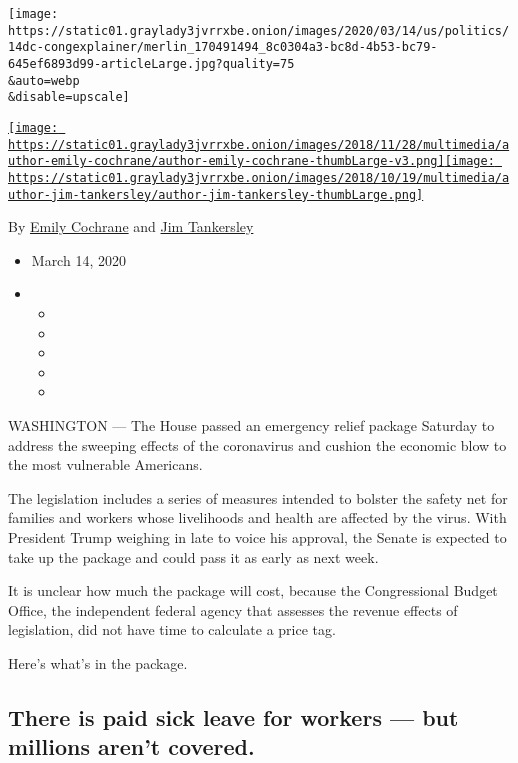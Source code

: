 \texttt{[image: https://static01.graylady3jvrrxbe.onion/images/2020/03/14/us/politics/14dc-congexplainer/merlin\_170491494\_8c0304a3-bc8d-4b53-bc79-645ef6893d99-articleLarge.jpg?quality=75\\\&auto=webp\\\&disable=upscale]}

\href{https://www.nytimes3xbfgragh.onion/by/emily-cochrane}{\texttt{[image: https://static01.graylady3jvrrxbe.onion/images/2018/11/28/multimedia/author-emily-cochrane/author-emily-cochrane-thumbLarge-v3.png]}}\href{https://www.nytimes3xbfgragh.onion/by/jim-tankersley}{\texttt{[image: https://static01.graylady3jvrrxbe.onion/images/2018/10/19/multimedia/author-jim-tankersley/author-jim-tankersley-thumbLarge.png]}}

By \href{https://www.nytimes3xbfgragh.onion/by/emily-cochrane}{Emily
Cochrane} and
\href{https://www.nytimes3xbfgragh.onion/by/jim-tankersley}{Jim
Tankersley}

\begin{itemize}
\item
  March 14, 2020
\item
  \begin{itemize}
  \item
  \item
  \item
  \item
  \item
  \end{itemize}
\end{itemize}

WASHINGTON --- The House passed an emergency relief package Saturday to
address the sweeping effects of the coronavirus and cushion the economic
blow to the most vulnerable Americans.

The legislation includes a series of measures intended to bolster the
safety net for families and workers whose livelihoods and health are
affected by the virus. With President Trump weighing in late to voice
his approval, the Senate is expected to take up the package and could
pass it as early as next week.

It is unclear how much the package will cost, because the Congressional
Budget Office, the independent federal agency that assesses the revenue
effects of legislation, did not have time to calculate a price tag.

Here's what's in the package.

\hypertarget{there-is-paid-sick-leave-for-workers--but-millions-arent-covered}{%
\subsection{There is paid sick leave for workers --- but millions aren't
covered.}\label{there-is-paid-sick-leave-for-workers--but-millions-arent-covered}}

